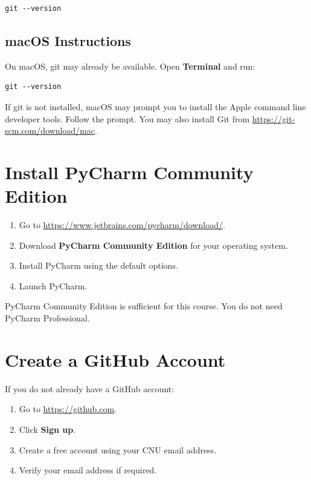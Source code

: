 \documentclass[11pt]{article}
\begin{document}
\begin{lstlisting}[style=terminal]
git --version
\end{lstlisting}

\subsection*{macOS Instructions}

On macOS, git may already be available. Open \textbf{Terminal} and run:

\begin{lstlisting}[style=terminal]
git --version
\end{lstlisting}

If git is not installed, macOS may prompt you to install the Apple command line developer tools. Follow the prompt. You may also install Git from \url{https://git-scm.com/download/mac}.

\section{Install PyCharm Community Edition}

\begin{enumerate}
    \item Go to \url{https://www.jetbrains.com/pycharm/download/}.
    \item Download \textbf{PyCharm Community Edition} for your operating system.
    \item Install PyCharm using the default options.
    \item Launch PyCharm.
\end{enumerate}

PyCharm Community Edition is sufficient for this course. You do not need PyCharm Professional.

\section{Create a GitHub Account}

If you do not already have a GitHub account:

\begin{enumerate}
    \item Go to \url{https://github.com}.
    \item Click \textbf{Sign up}.
    \item Create a free account using your CNU email address.
    \item Verify your email address if required.
\end{enumerate}
\end{document}
